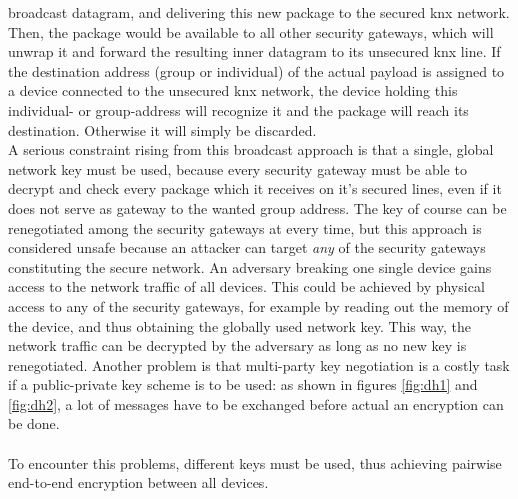 broadcast datagram, and delivering this new package to the secured \gls{knx} network. Then, the package would be available to all other security gateways, which
will unwrap it and forward the resulting inner datagram to its unsecured \gls{knx} line. If the destination address (group or individual) of the actual payload
is assigned to a device connected
to the unsecured \gls{knx} network, the device holding this individual- or group-address will recognize it and the package will reach its destination. 
Otherwise it will simply be discarded.
\\
A serious constraint rising from this broadcast approach is that a single,
global network key must be used, because every security gateway must be able to decrypt and check every package which it receives on it's secured lines,
even if it does not serve as gateway to the wanted group address. 
The key of course can be renegotiated among the security gateways at every time, but this approach is considered
unsafe because an attacker can target \textit{any} of the security gateways constituting the secure network. An adversary breaking one single device gains
access to the network traffic of all devices. This could be achieved by physical access to any of the security gateways, for example by reading out the
memory of the device, and thus obtaining the globally used network key. This way, the network traffic can be decrypted by the adversary as long as no new
key is renegotiated. Another problem is that multi-party key negotiation is a costly task if a public-private key scheme
is to be used: as shown in figures \ref{fig:dh1} and \ref{fig:dh2}, a lot of messages have to be exchanged before actual an encryption can be done. 
\\
\\
To encounter this problems, different keys must be used, thus achieving pairwise end-to-end encryption between all devices. 
